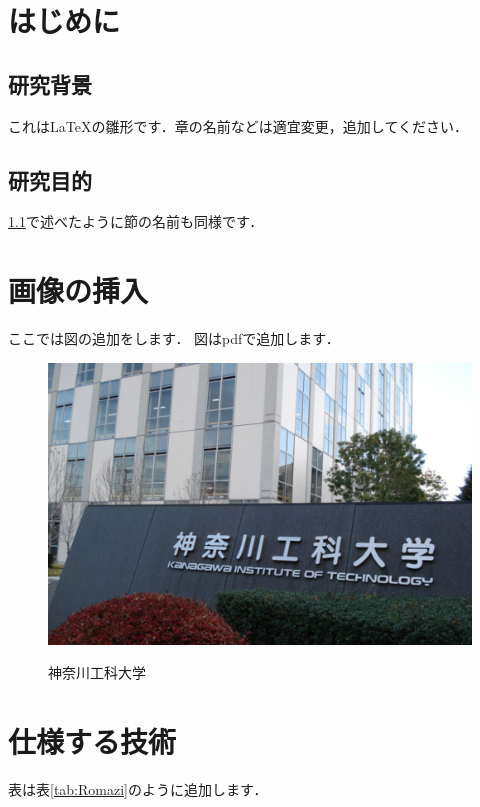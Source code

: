 






\SetFront

\chapter{はじめに}
\section{研究背景}
\label{sec:1.1}
これはLaTeXの雛形です．章の名前などは適宜変更，追加してください．

\section{研究目的}
\ref{sec:1.1}で述べたように節の名前も同様です．

\chapter{画像の挿入}
ここでは図の追加をします．
図はpdfで追加します．
\begin{figure}[hb]
    \begin{center}  
        \includegraphics[width=0.725\linewidth]{Figure/kanagawa.pdf}　%
        \caption{神奈川工科大学\cite{kanakouPage}}
        \label{fig:kanakou}
    \end{center}
\end{figure}


\chapter{仕様する技術}
\label{sec:3}
表は表\ref{tab:Romazi}のように追加します．

